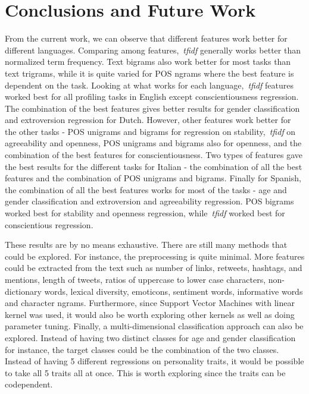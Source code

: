 \documentclass[a4paper]{llncs}
\begin{document}
\section{Conclusions and Future Work}
From the current work, we can observe that different features work better for different languages. Comparing among features,~\textit{tfidf} generally works better than normalized term frequency. Text bigrams also work better for most tasks than text trigrams, while it is quite varied for POS ngrams where the best feature is dependent on the task. Looking at what works for each language,~\textit{tfidf} features worked best for all profiling tasks in English except conscientiousness regression. The combination of the best features gives better results for gender classification and extroversion regression for Dutch. However, other features work better for the other tasks - POS unigrams and bigrams for regression on stability,~\textit{tfidf} on agreeability and openness, POS unigrams and bigrams also for openness, and the combination of the best features for conscientiousness. Two types of features gave the best results for the different tasks for Italian - the combination of all the best features and the combination of POS unigrams and bigrams. Finally for Spanish, the combination of all the best features works for most of the tasks - age and gender classification and extroversion and agreeability regression. POS bigrams worked best for stability and openness regression, while~\textit{tfidf} worked best for conscientious regression.

These results are by no means exhaustive. There are still many methods that could be explored. For instance, the preprocessing is quite minimal. More features could be extracted from the text such as number of links, retweets, hashtags, and mentions, length of tweets, ratios of uppercase to lower case characters, non-dictionary words, lexical diversity, emoticons, sentiment words, informative words and character ngrams. Furthermore, since Support Vector Machines with linear kernel was used, it would also be worth exploring other kernels as well as doing parameter tuning. Finally, a multi-dimensional classification approach can also be explored. Instead of having two distinct classes for age and gender classification for instance, the target classes could be the combination of the two classes. Instead of having 5 different regressions on personality traits, it would be possible to take all 5 traits all at once. This is worth exploring since the traits can be codependent. 





\end{document}
